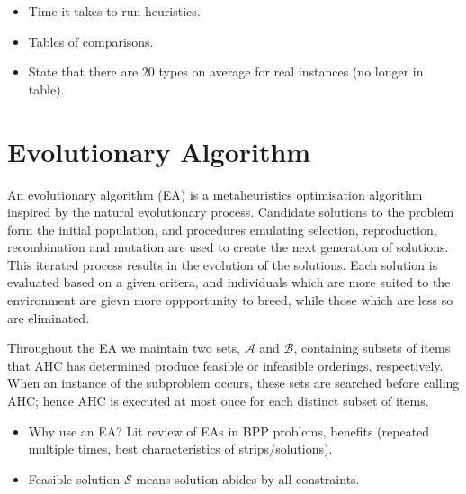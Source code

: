 \documentclass{elsarticle}
\begin{document}
{\color{Rhodamine}
\begin{itemize}[leftmargin=*]
	\item Time it takes to run heuristics.
	\item Tables of comparisons.
	\item State that there are 20 types on average for real instances (no longer in table).
\end{itemize}
}


\section{Evolutionary Algorithm}
\label{sec:ea}
An evolutionary algorithm (EA) is a metaheuristics optimisation algorithm inspired by the natural evolutionary process. Candidate solutions to the problem form the initial population, and procedures emulating selection, reproduction, recombination and mutation are used to create the next generation of solutions. This iterated process results in the evolution of the solutions. Each solution is evaluated based on a given critera, and individuals which are more suited to the environment are gievn more oppportunity to breed, while those which are less so are eliminated.


Throughout the EA we maintain two sets, $\mathcal{A}$ and $\mathcal{B}$, containing subsets of items that AHC has determined produce feasible or infeasible orderings, respectively. When an instance of the subproblem occurs, these sets are searched before calling AHC; hence AHC is executed at most once for each distinct subset of items.

{\color{OrangeRed}
\begin{itemize}[leftmargin=*]
	\item Why use an EA? Lit review of EAs in BPP problems, benefits (repeated multiple times, best characteristics of strips/solutions).
	\item Feasible solution $\mathcal{S}$ means solution abides by all constraints.
\end{itemize}
}
\end{document}
